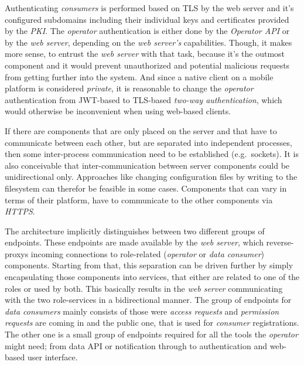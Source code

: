 \documentclass[12pt,english,a4paper,titlepage,cleardoublepage=empty,dottedtoc]{report}
\begin{document}
Authenticating \emph{consumers} is performed based on TLS by the web
server and it's configured subdomains including their individual keys
and certificates provided by the \emph{PKI}. The \emph{operator}
authentication is either done by the \emph{Operator API} or by the
\emph{web server}, depending on the \emph{web server's} capabilities.
Though, it makes more sense, to entrust the \emph{web server} with that
task, because it's the outmost component and it would prevent
unauthorized and potential malicious requests from getting further into
the system. And since a native client on a mobile platform is considered
\emph{private}, it is reasonable to change the \emph{operator}
authentication from JWT-based to TLS-based \emph{two-way
authentication}, which would otherwise be inconvenient when using
web-based clients.

If there are components that are only placed on the server and that have
to communicate between each other, but are separated into independent
processes, then some inter-process communication need to be established
(e.g.~sockets). It is also conceivable that inter-communication between
server components could be unidirectional only. Approaches like changing
configuration files by writing to the filesystem can therefor be
feasible in some cases. Components that can vary in terms of their
platform, have to communicate to the other components via \emph{HTTPS}.

The architecture implicitly distinguishes between two different groups
of endpoints. These endpoints are made available by the \emph{web
server}, which reverse-proxys incoming connections to role-related
(\emph{operator} or \emph{data consumer}) components. Starting from
that, this separation can be driven further by simply encapsulating
those components into services, that either are related to one of the
roles or used by both. This basically results in the \emph{web server}
communicating with the two role-services in a bidirectional manner. The
group of endpoints for \emph{data consumers} mainly consists of those
were \emph{access requests} and \emph{permission requests} are coming in
and the public one, that is used for \emph{consumer} registrations. The
other one is a small group of endpoints required for all the tools the
\emph{operator} might need; from data API or notification through to
authentication and web-based user interface.
\end{document}
